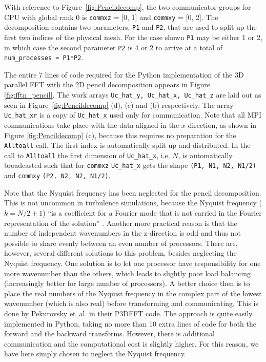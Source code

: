 \documentclass[final,3p,times,twocolumn]{elsarticle}
\newcommand{\inpyth}{\lstinline[style=inlinestyle]} %[]%
\begin{document}

With reference to Figure~\ref{fig:Pencildecomp}, the two communicator groups for CPU with global rank 0 is
\inpyth{commxz} = [0, 1] and \inpyth{commxy} = [0, 2]. The decomposition contains two parameters, \inpyth{P1} and \inpyth{P2}, that are used to split up the first two indices of the physical mesh.
For the case shown \inpyth{P1} may be either 1 or 2, in which case the second parameter \inpyth{P2}
is 4 or 2 to arrive at a total of \inpyth{num_processes = P1*P2}.

The entire 7 lines of code required for the Python implementation of the 3D 
parallel FFT 
with the 2D pencil decomposition appears in Figure \ref{fig:fftn_pencil}. The 
work arrays \inpyth{Uc_hat_y, Uc_hat_x, Uc_hat_z} are laid out as seen in 
Figure~\ref{fig:Pencildecomp} (d), (c) and (b) respectively. The array
\inpyth{Uc_hat_xr} is a copy of \inpyth{Uc_hat_x} used only for communication. 
Note that all MPI communications take place with the data aligned in the 
$x$-direction, as shown in Figure \ref{fig:Pencildecomp} (c), because this 
requires no preparation for the \inpyth{Alltoall} call. The first
index is automatically split up and distributed.  In the call to 
\inpyth{Alltoall} the first dimension of \inpyth{Uc_hat_x}, i.e. $N$, is 
automatically broadcasted such that for \inpyth{commxz} \inpyth{Uc_hat_x}
gets the shape \inpyth{(P1, N1, N2, N1/2)} and \inpyth{commxy} \inpyth{(P2, N2, N2, N1/2)}.

Note that the Nyquist frequency has been neglected for the pencil 
decomposition. This is not uncommon in turbulence simulations, because the 
Nyquist frequency ($k=N/2+1$) ``is a coefficient for a Fourier mode
that is not carried in the Fourier representation of the solution'' 
\cite{Lee2013}.  Another more practical reason is that the number of 
independent wavenumbers in the z-direction is odd and thus not possible to 
share evenly between an even number of processors. There are, however, several 
different solutions to this problem, besides neglecting the Nyquist frequency. 
One solution is to let one processor have responsibility for one
more wavenumber than the others, which leads to slightly poor load balancing 
(increasingly better for large number of processors). A better choice then is 
to place the real numbers of the Nyquist frequency in the complex part of the 
lowest wavenumber (which is also real) before transforming and communicating. 
This is done by Pekurovsky et~al. \cite{pekurovsky2012} in their P3DFFT code. 
The approach is quite easily implemented in Python, taking no more than 10 
extra lines of code for both the forward and the backward
transforms. However, there is additional communication and the computational 
cost is slightly higher. For this reason, we have here simply chosen to neglect 
the Nyquist frequency.
\end{document}
